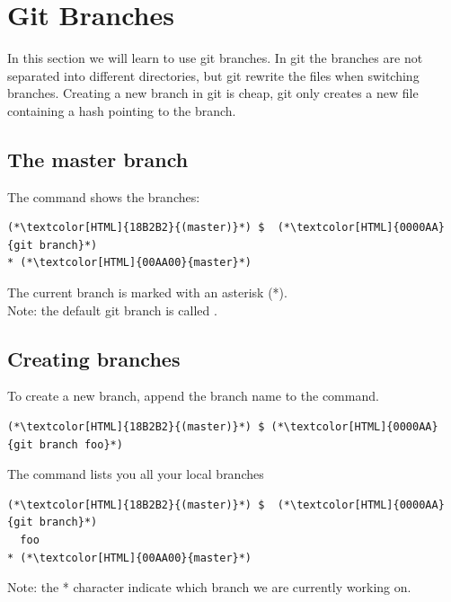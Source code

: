 \section{Git Branches}
\begin{frame}[fragile]
  \slidetitle
  In this section we will learn to use git branches.
  In git the branches are not separated into different directories, but git rewrite the files when switching branches.
  Creating a new branch in git is cheap, git only creates a new file containing a hash pointing to the branch.
\end{frame}

\subsection{The master branch}
\begin{frame}[fragile]
  \subslidetitle

  The command  shows the branches:
  \begin{lstlisting}
(*\textcolor[HTML]{18B2B2}{(master)}*) $  (*\textcolor[HTML]{0000AA}{git branch}*)
* (*\textcolor[HTML]{00AA00}{master}*)
\end{lstlisting}

  The current branch is marked with an asterisk (*).
  \\
  \vspace{1em}
  Note: the default git branch is called .

\end{frame}

\subsection{Creating branches}
\begin{frame}[fragile]
    \subslidetitle

To create a new  branch, append the branch name to the  command.
\begin{lstlisting}
(*\textcolor[HTML]{18B2B2}{(master)}*) $ (*\textcolor[HTML]{0000AA}{git branch foo}*)
\end{lstlisting}

The  command lists you all your local branches
\begin{lstlisting}
(*\textcolor[HTML]{18B2B2}{(master)}*) $  (*\textcolor[HTML]{0000AA}{git branch}*)
  foo
* (*\textcolor[HTML]{00AA00}{master}*)
\end{lstlisting}

Note: the * character indicate which branch we are currently working on.
\end{frame}


